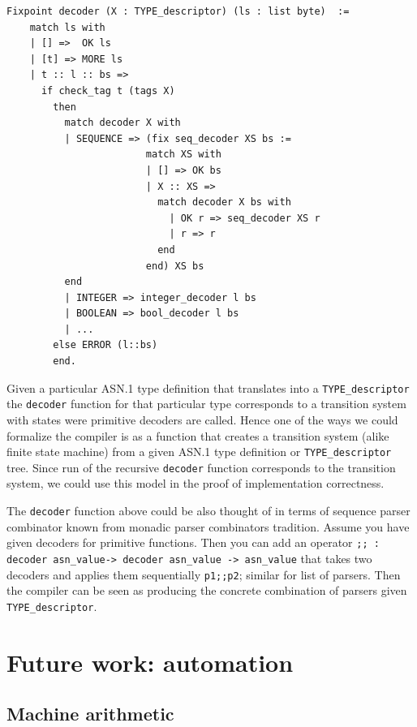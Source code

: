 \documentclass[acmsmall,nonacm]{acmart}
\begin{document}
 \begin{lstlisting}[language=Coq]
 Fixpoint decoder (X : TYPE_descriptor) (ls : list byte)  :=
    match ls with
    | [] =>  OK ls
    | [t] => MORE ls       
    | t :: l :: bs =>          
      if check_tag t (tags X)
        then
          match decoder X with 
          | SEQUENCE => (fix seq_decoder XS bs :=
                        match XS with
                        | [] => OK bs
                        | X :: XS =>
                          match decoder X bs with
                            | OK r => seq_decoder XS r 
                            | r => r
                          end
                        end) XS bs
          end
          | INTEGER => integer_decoder l bs
          | BOOLEAN => bool_decoder l bs
          | ...                                    
        else ERROR (l::bs)
        end.
 \end{lstlisting}

Given a particular ASN.1 type definition that translates into a \texttt{TYPE\_descriptor} the \texttt{decoder} function for that particular type corresponds to a transition system with states were primitive decoders are called. Hence one of the ways we could formalize the compiler is as a function that creates a transition system (alike finite state machine) from a given ASN.1 type definition or \texttt{TYPE\_descriptor} tree. Since run of the recursive \texttt{decoder} function corresponds to the transition system, we could use this model in the proof of implementation correctness.

The \texttt{decoder} function above could be also thought of in terms of sequence parser combinator known from monadic parser combinators tradition\cite{TODO}. Assume you have given decoders for primitive functions. Then you can add an operator \texttt{;; : decoder asn\_value-> decoder asn\_value -> asn\_value} that takes two decoders and applies them sequentially \texttt{p1;;p2}; similar for list of parsers. Then the compiler can be seen as producing the concrete combination of parsers given \texttt{TYPE\_descriptor}.   


\section{Future work: automation}


\subsection{Machine arithmetic}
\end{document}
